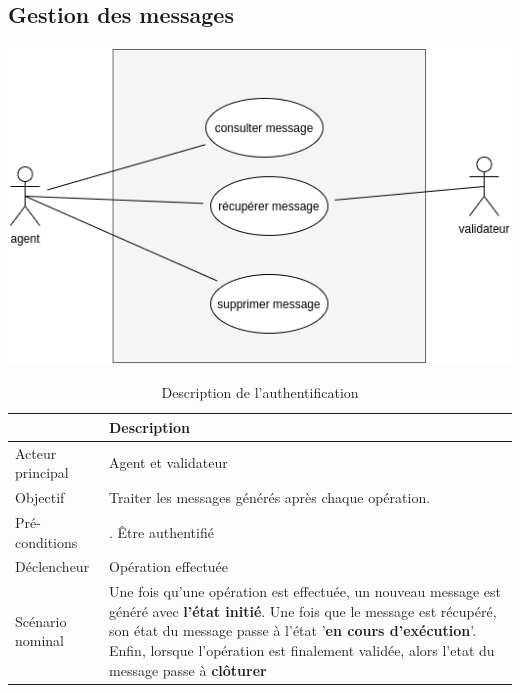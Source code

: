 		\subsection*{Gestion des messages}
			\begin{center}
				\includegraphics[scale=0.5]{chap_2/message.png}
				\label{Gestion des messages}
			\end{center}
			\begin{table}[H]
				\begin{center}
					{\renewcommand{\arraystretch}{1.5}\begin{tabularx}{\textwidth}{|l|X|}
							\hline & Description \\
							\hline Acteur principal & Agent et validateur \\
							\hline Objectif & Traiter les messages générés après chaque opération.\\
							\hline Pré-conditions & . Être authentifié\\
							\hline Déclencheur & Opération effectuée\\
							\hline
							Scénario nominal & Une fois qu'une opération est effectuée, un  nouveau message est généré avec \textbf{l'état initié}.\newline
							Une fois que le message est récupéré, son état du message passe à l'état '\textbf{en cours d'exécution}'.\newline
							Enfin, lorsque l'opération est finalement validée, alors l'etat du message passe à \textbf{clôturer}
							\\
							\hline              
					\end{tabularx}}
				\end{center}
				\caption{Description de l'authentification} 
			\end{table}

